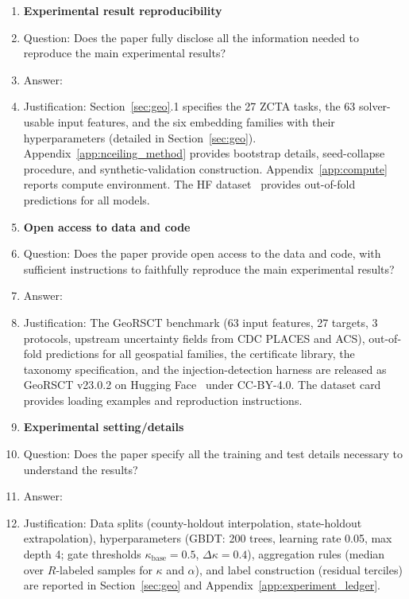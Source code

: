 \documentclass{article}
\begin{document}
\begin{enumerate}
\item {\bf Experimental result reproducibility}
    \item[] Question: Does the paper fully disclose all the information needed to reproduce the main experimental results?
    \item[] Answer: \answerYes{}
    \item[] Justification: Section~\ref{sec:geo}.1 specifies the 27 ZCTA tasks, the 63 solver-usable input features, and the six embedding families with their hyperparameters (detailed in Section~\ref{sec:geo}). Appendix~\ref{app:nceiling_method} provides bootstrap details, seed-collapse procedure, and synthetic-validation construction. Appendix~\ref{app:compute} reports compute environment. The HF dataset~\citep{geocert2026} provides out-of-fold predictions for all models.

\item {\bf Open access to data and code}
    \item[] Question: Does the paper provide open access to the data and code, with sufficient instructions to faithfully reproduce the main experimental results?
    \item[] Answer: \answerYes{}
    \item[] Justification: The GeoRSCT benchmark (63 input features, 27 targets, 3 protocols, upstream uncertainty fields from CDC PLACES and ACS), out-of-fold predictions for all geospatial families, the certificate library, the taxonomy specification, and the injection-detection harness are released as GeoRSCT v23.0.2 on Hugging Face~\citep{geocert2026} under CC-BY-4.0. The dataset card provides loading examples and reproduction instructions.

\item {\bf Experimental setting/details}
    \item[] Question: Does the paper specify all the training and test details necessary to understand the results?
    \item[] Answer: \answerYes{}
    \item[] Justification: Data splits (county-holdout interpolation, state-holdout extrapolation), hyperparameters (GBDT: 200 trees, learning rate 0.05, max depth 4; gate thresholds $\kappa_{\text{base}}{=}0.5$, $\Delta\kappa{=}0.4$), aggregation rules (median over $R$-labeled samples for $\kappa$ and $\alpha$), and label construction (residual terciles) are reported in Section~\ref{sec:geo} and Appendix~\ref{app:experiment_ledger}.


\end{enumerate}
\end{document}
